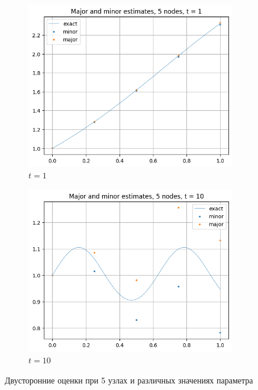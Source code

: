\begin{figure}[H]
	\centering
	\begin{subfigure}{0.45\textwidth}
		\centering
		\includegraphics[width=\linewidth]{img/visualization/TwoSided5nodest1}
		\caption{$t = 1$}
	\end{subfigure}
	\hfill
	\begin{subfigure}{0.45\textwidth}
		\centering
		\includegraphics[width=\linewidth]{img/visualization/TwoSided5nodest2}
		\caption{$t = 10$}
	\end{subfigure}
	\caption{Двусторонние оценки при 5 узлах и различных значениях параметра}
	\label{fig:two_graphs}
\end{figure}

